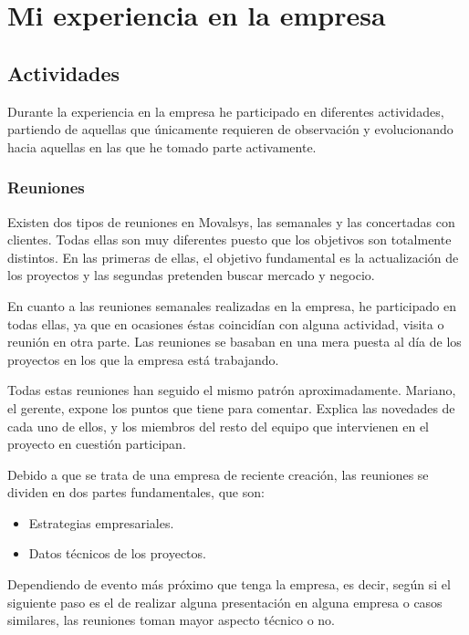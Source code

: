 \chapter{Mi experiencia en la empresa}

	\section{Actividades}
	
		Durante la experiencia en la empresa he participado en diferentes actividades, partiendo de aquellas que únicamente requieren de observación y evolucionando hacia aquellas en las que he tomado parte activamente.
	
		\subsection{Reuniones}
		
				
			Existen dos tipos de reuniones en Movalsys, las semanales y las concertadas con clientes. Todas ellas son muy diferentes puesto que los objetivos son totalmente distintos. En las primeras de ellas, el objetivo fundamental es la actualización de los proyectos y las segundas pretenden buscar mercado y negocio.
			 
			En cuanto a las reuniones semanales realizadas en la empresa, he participado en todas ellas, ya que en ocasiones éstas coincidían con alguna actividad, visita o reunión en otra parte. Las reuniones se basaban en una mera puesta al día de los proyectos en los que la empresa está trabajando.
			
			Todas estas reuniones han seguido el mismo patrón aproximadamente. Mariano, el gerente, expone los puntos que tiene para comentar. Explica las novedades de cada uno de ellos, y los miembros del resto del equipo que intervienen en el proyecto en cuestión participan.
			
			Debido a que se trata de una empresa de reciente creación, las reuniones se dividen en dos partes fundamentales, que son:
			\begin{itemize}
				\item Estrategias empresariales.
				\item Datos técnicos de los proyectos.
			\end{itemize}
			
			Dependiendo de evento más próximo que tenga la empresa, es decir, según si el siguiente paso es el de realizar alguna presentación en alguna empresa o casos similares, las reuniones toman mayor aspecto técnico o no.
			
